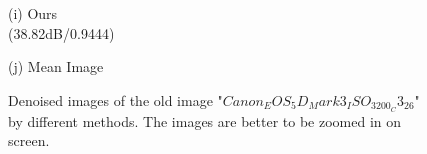 \documentclass[10pt,twocolumn,letterpaper]{article}
\begin{document}
\begin{figure}
{\begin{minipage}[t]{0.2\textwidth}
{\footnotesize (i) Ours \\ (38.82dB/0.9444) }
\end{minipage}
\begin{minipage}[t]{0.2\textwidth}
\centering
{}
{\footnotesize (j) Mean Image }
\end{minipage}
}
\caption{Denoised images of the old image "$Canon_EOS_5D_Mark3_ISO_3200_C3_26$" by different methods. The images are better to be zoomed in on screen.}
\label{fig2}
\end{figure}
\end{document}
